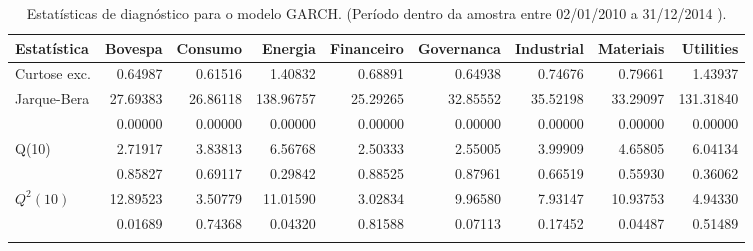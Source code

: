 \begin{longtable}{lrrrrrrrr}
\caption{Estatísticas de diagnóstico para o modelo GARCH. 
               (Período dentro da amostra entre 02/01/2010 a 31/12/2014 ).} \\ 
  \toprule
Estatística & Bovespa & Consumo & Energia & Financeiro & Governanca & Industrial & Materiais & Utilities \\ 
  \midrule
Curtose exc. & 0.64987 & 0.61516 & 1.40832 & 0.68891 & 0.64938 & 0.74676 & 0.79661 & 1.43937 \\ 
  Jarque-Bera & 27.69383 & 26.86118 & 138.96757 & 25.29265 & 32.85552 & 35.52198 & 33.29097 & 131.31840 \\ 
   & 0.00000 & 0.00000 & 0.00000 & 0.00000 & 0.00000 & 0.00000 & 0.00000 & 0.00000 \\ 
  Q(10) & 2.71917 & 3.83813 & 6.56768 & 2.50333 & 2.55005 & 3.99909 & 4.65805 & 6.04134 \\ 
   & 0.85827 & 0.69117 & 0.29842 & 0.88525 & 0.87961 & 0.66519 & 0.55930 & 0.36062 \\ 
  $Q^2(10)$ & 12.89523 & 3.50779 & 11.01590 & 3.02834 & 9.96580 & 7.93147 & 10.93753 & 4.94330 \\ 
   & 0.01689 & 0.74368 & 0.04320 & 0.81588 & 0.07113 & 0.17452 & 0.04487 & 0.51489 \\ 
   \bottomrule
\label{tab:garchstats}
\end{longtable}
